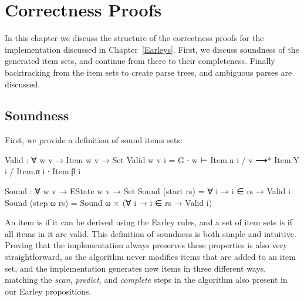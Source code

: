 
\chapter{Correctness Proofs} \label{Correctness}

	In this chapter we discuss the structure of the correctness proofs for the
	implementation discussed in Chapter~\ref{Earleys}. First, we discuss
	soundness of the generated item sets, and continue from there to their
	completeness. Finally backtracking from the item sets to create parse
	trees, and ambiguous parses are discussed.

	\section{Soundness}

		First, we provide a definition of sound items sets:

		\begin{code}
			  Valid : ∀ {w v} → Item w v → Set
			  Valid {w} {v} i = G ∙ w ⊢ Item.u i / v ⟶* Item.Y i / Item.α i ∙ Item.β i
			
			  Sound : ∀ {w v} → EState w v → Set
			  Sound (start rs) = ∀ {i} → i ∈ rs → Valid i
			  Sound (step ω rs) = Sound ω × (∀ {i} → i ∈ rs → Valid i)
		\end{code}

		An item is  if it can be derived using the Earley rules,
		and a set of item sets is  if all items in it are valid.
		This definition of soundness is both simple and intuitive. Proving that
		the implementation always preserves these properties is also very
		straightforward, as the algorithm never modifies items that are added
		to an item set, and the implementation generates new items in three
		different ways, matching the \emph{scan}, \emph{predict}, and
		\emph{complete} steps in the algorithm also present in our Earley
		propositions.

